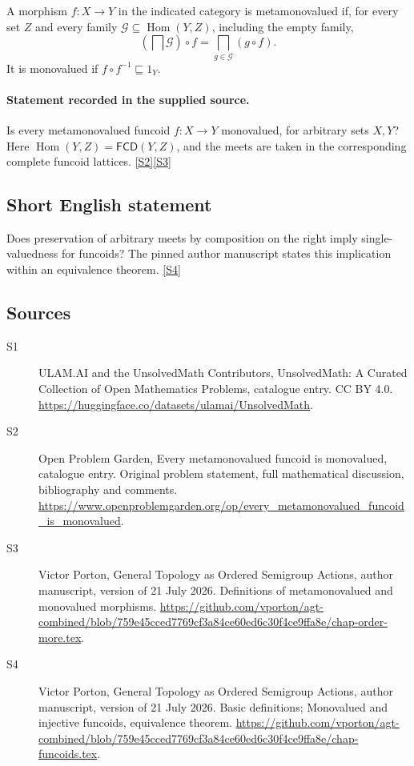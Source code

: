 \documentclass[11pt]{article}
\newcommand{\sref}[2]{\hyperlink{source:#1:#2}{[S#2]}}
\begin{document}
A morphism $f:X\to Y$ in the indicated category is metamonovalued if, for every set $Z$ and every family $\mathcal G\subseteq\operatorname{Hom}(Y,Z)$, including the empty family,
\[
 \left(\bigsqcap\mathcal G\right)\circ f
 =\bigsqcap_{g\in\mathcal G}(g\circ f).
\]
It is monovalued if $f\circ f^{-1}\sqsubseteq1_Y$.
\paragraph{Statement recorded in the supplied source.}
Is every metamonovalued funcoid $f:X\to Y$ monovalued, for arbitrary sets $X,Y$? Here $\operatorname{Hom}(Y,Z)=\mathsf{FCD}(Y,Z)$, and the meets are taken in the corresponding complete funcoid lattices. \sref{statement}{2}\sref{statement}{3}
\subsection{Short English statement}
Does preservation of arbitrary meets by composition on the right imply single-valuedness for funcoids? The pinned author manuscript states this implication within an equivalence theorem. \sref{statement}{4}
\subsection{Sources}
\begin{description}
\item[\hypertarget{source:statement:1}{S1}] ULAM.AI and the UnsolvedMath Contributors, UnsolvedMath: A Curated Collection of Open Mathematics Problems, catalogue entry. CC BY 4.0. \url{https://huggingface.co/datasets/ulamai/UnsolvedMath}.
\item[\hypertarget{source:statement:2}{S2}] Open Problem Garden, Every metamonovalued funcoid is monovalued, catalogue entry. Original problem statement, full mathematical discussion, bibliography and comments. \url{https://www.openproblemgarden.org/op/every_metamonovalued_funcoid_is_monovalued}.
\item[\hypertarget{source:statement:3}{S3}] Victor Porton, General Topology as Ordered Semigroup Actions, author manuscript, version of 21 July 2026. Definitions of metamonovalued and monovalued morphisms. \url{https://github.com/vporton/agt-combined/blob/759e45cced7769cf3a84ce60ed6c30f4ce9ffa8e/chap-order-more.tex}.
\item[\hypertarget{source:statement:4}{S4}] Victor Porton, General Topology as Ordered Semigroup Actions, author manuscript, version of 21 July 2026. Basic definitions; Monovalued and injective funcoids, equivalence theorem. \url{https://github.com/vporton/agt-combined/blob/759e45cced7769cf3a84ce60ed6c30f4ce9ffa8e/chap-funcoids.tex}.
\end{description}
\label{end:statement}
\end{document}
